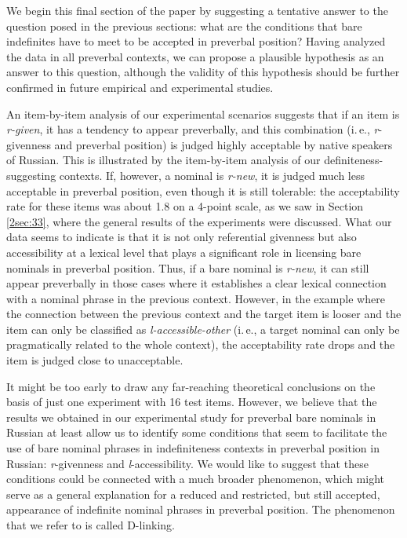 \documentclass[output=paper]{langsci/langscibook}
\begin{document}
We begin this final section of the paper by suggesting a tentative answer to the question posed in the previous sections: what are the conditions that bare indefinites have to meet to be accepted in preverbal position? Having analyzed the data in all preverbal contexts, we can propose a plausible hypothesis as an answer to this question, although the validity of this hypothesis should be further confirmed in future empirical and experimental studies.

{
An item-by-item analysis of our experimental scenarios suggests that if an item is {\emph{r-given}}, it has a tendency to appear preverbally, and this combination (i.\,e., {\emph{r}}-givenness and preverbal position) is judged highly acceptable by native speakers of Russian. This is illustrated by the item-by-item analysis of our definiteness-suggesting contexts. If, however, a nominal is {\emph{r-new}}, it is judged much less acceptable in preverbal position, even though it is still tolerable: the acceptability rate for these items was about 1.8 on a 4-point scale, as we saw in Section \ref{2sec:33}, where the general results of the experiments were discussed. What our data seems to indicate is that it is not only referential givenness but also accessibility at a lexical level that plays a significant role in licensing bare nominals in preverbal position. Thus, if a bare nominal is {\emph{r-new}}, it can still appear preverbally in those cases where it establishes a clear lexical connection with a nominal phrase in the previous context. However, in the example where the connection between the previous context and the target item is looser and the item can only be classified as {\emph{l-accessible-other}} (i.\,e., a target nominal can only be pragmatically related to the whole context), the acceptability rate drops and the item is judged close to unacceptable.
}

It might be too early to draw any far-reaching theoretical conclusions on the basis of just one experiment with 16 test items. However, we believe that the results we obtained in our experimental study for preverbal bare nominals in Russian at least allow us to identify some conditions that seem to facilitate the use of bare nominal phrases in indefiniteness contexts in preverbal position in Russian: {\emph{r}}-givenness and {\emph{l}}-accessibility. We would like to suggest that these conditions could be connected with a much broader phenomenon, which might serve as a general explanation for a reduced and restricted, but still accepted, appearance of indefinite nominal phrases in preverbal position. The phenomenon that we refer to is called D-linking.
\end{document}

